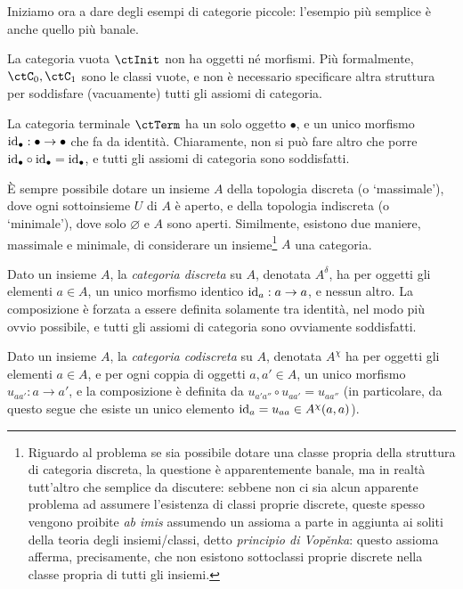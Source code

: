 \medskip
Iniziamo ora a dare degli esempi di categorie piccole: l'esempio più semplice è anche quello più banale.
\begin{example}\label{ex_cat_vuota}
	La categoria vuota $\ctInit$ non ha oggetti né morfismi. Più formalmente, $\ctC_0,\ctC_1$ sono le classi vuote, e non è necessario specificare altra struttura per soddisfare (vacuamente) tutti gli assiomi di categoria.
\end{example}
\begin{example}\label{ex_cat_term}
La categoria terminale $\ctTerm$ ha un solo oggetto \(\bullet\), e un unico morfismo $\mathrm{id}_\bullet : \bullet\to\bullet$ che fa da identità. Chiaramente, non si può fare altro che porre $\mathrm{id}_\bullet\circ\mathrm{id}_\bullet=\mathrm{id}_\bullet$, e tutti gli assiomi di categoria sono soddisfatti.
\end{example}
\`E sempre possibile dotare un insieme \(A\) della topologia discreta (o `massimale'), dove ogni sottoinsieme \(U\) di \(A\) è aperto, e della topologia indiscreta (o `minimale'), dove solo \(\varnothing\) e \(A\) sono aperti. Similmente, esistono due maniere, massimale e minimale, di considerare un insieme\footnote{Riguardo al problema se sia possibile dotare una classe propria della struttura di categoria discreta, la questione è apparentemente banale, ma in realtà tutt'altro che semplice da discutere: sebbene non ci sia alcun apparente problema ad assumere l'esistenza di classi proprie discrete, queste spesso vengono proibite \emph{ab imis} assumendo un assioma a parte in aggiunta ai soliti della teoria degli insiemi/classi, detto \emph{principio di Vop\v enka}: questo assioma afferma, precisamente, che non esistono sottoclassi proprie discrete nella classe propria di tutti gli insiemi.} $A$ una categoria.
\begin{example}\label{ex_cat_discreta}
	Dato un insieme $A$, la \emph{categoria discreta} su $A$, denotata $A^\delta$, ha per oggetti gli elementi $a\in A$, un unico morfismo identico $\mathrm{id}_a : a\to a$, e nessun altro. La composizione è forzata a essere definita solamente tra identità, nel modo più ovvio possibile, e tutti gli assiomi di categoria sono ovviamente soddisfatti.
\end{example}
\begin{example}\label{ex_cat_codiscreta}
	Dato un insieme $A$, la \emph{categoria codiscreta} su $A$, denotata $A^\chi$ ha per oggetti gli elementi $a\in A$, e per ogni coppia di oggetti $a,a'\in A$, un unico morfismo $u_{aa'}:a\to a'$, e la composizione è definita da $u_{a'a''}\circ u_{aa'}=u_{aa''}$ (in particolare, da questo segue che esiste un unico elemento $\mathrm{id}_a=u_{aa}\in A^\chi(a,a)$).
\end{example}
